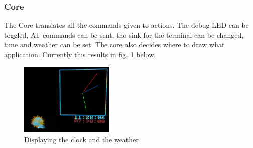 \subsubsection{Core}
The Core translates all the commands given to actions. The debug LED can be toggled, AT commands can be sent, the sink for the terminal can be changed, time and weather can be set. The core also decides where to draw what application. Currently this results in fig. \ref{fig:clock_weather} below.
\begin{figure}[H]
	\centering
	\label{fig:clock_weather}
	\includegraphics[width=0.4\textwidth]{./fig/clock_weather.png}
	\caption{Displaying the clock and the weather}
\end{figure}